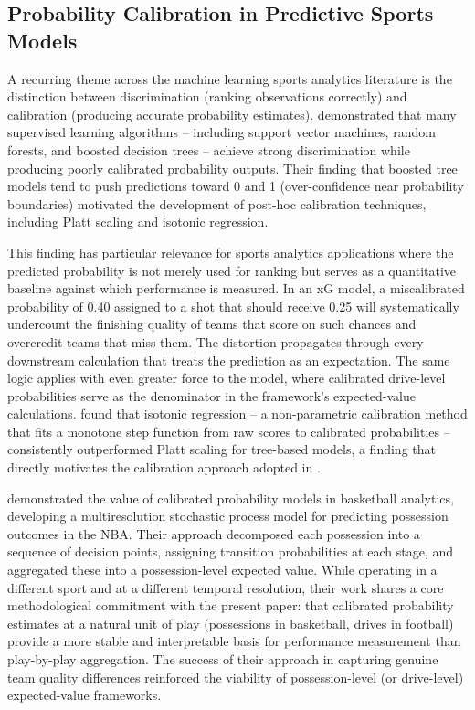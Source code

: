 \subsection{Probability Calibration in Predictive Sports Models}
\label{sec:calibration-literature}

A recurring theme across the machine learning sports analytics literature is the distinction between discrimination (ranking observations correctly) and calibration (producing accurate probability estimates). \textcite{niculescumizil2005probabilities} demonstrated that many supervised learning algorithms  -- including support vector machines, random forests, and boosted decision trees  -- achieve strong discrimination while producing poorly calibrated probability outputs. Their finding that boosted tree models tend to push predictions toward 0 and 1 (over-confidence near probability boundaries) motivated the development of post-hoc calibration techniques, including Platt scaling and isotonic regression.

This finding has particular relevance for sports analytics applications where the predicted probability is not merely used for ranking but serves as a quantitative baseline against which performance is measured. In an xG model, a miscalibrated probability of 0.40 assigned to a shot that should receive 0.25 will systematically undercount the finishing quality of teams that score on such chances and overcredit teams that miss them. The distortion propagates through every downstream calculation that treats the prediction as an expectation. The same logic applies with even greater force to the \xscore{} model, where calibrated drive-level probabilities serve as the denominator in the \gds{} framework's expected-value calculations. \textcite{niculescumizil2005probabilities} found that isotonic regression  -- a non-parametric calibration method that fits a monotone step function from raw scores to calibrated probabilities  -- consistently outperformed Platt scaling for tree-based models, a finding that directly motivates the calibration approach adopted in .

\textcite{cervone2016multiresolution} demonstrated the value of calibrated probability models in basketball analytics, developing a multiresolution stochastic process model for predicting possession outcomes in the NBA. Their approach decomposed each possession into a sequence of decision points, assigning transition probabilities at each stage, and aggregated these into a possession-level expected value. While operating in a different sport and at a different temporal resolution, their work shares a core methodological commitment with the present paper: that calibrated probability estimates at a natural unit of play (possessions in basketball, drives in football) provide a more stable and interpretable basis for performance measurement than play-by-play aggregation. The success of their approach in capturing genuine team quality differences reinforced the viability of possession-level (or drive-level) expected-value frameworks.
